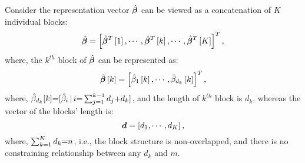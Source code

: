 Consider the representation vector $\hat{\boldsymbol{\beta}}$ can be viewed as a concatenation of $K$ individual blocks:
\begin{equation*}
\label{eq:Beta Structure-whole}
\hat{\boldsymbol{\beta}} = \left[ \hat{\boldsymbol{\beta}}^T\left[ 1 \right], \cdots, \hat{\boldsymbol{\beta}}^T\left[ k \right], \cdots, \hat{\boldsymbol{\beta}}^T\left[ K \right] \right]^T,
\end{equation*}
where, the $k^{th}$ block of $\hat{\boldsymbol{\beta}}$ can be represented as:
\begin{equation*}
\label{eq:Beta Structure-block}
\hat{\boldsymbol{\beta}}\left[ k \right] = \left[ \hat{\beta}_1\left[ k \right], \cdots, \hat{\beta}_{d_k} \left[ k \right] \right]^T,
\end{equation*}
where, $\hat{\beta}_{d_k}[k] {=} [\hat{\beta}_i \, | \, i {=} \sum_{j {=} 1}^{k {-} 1} d_j {+} d_k]$, and the length of $k^{th}$ block is $d_k$, whereas the vector of the blocks' length is:
\begin{equation*}
\label{eq:d}
\boldsymbol{d} = \left[ d_1, \cdots, d_K \right],
\end{equation*}
where, $\sum_{k=1}^K d_k {=} n$, i.e., the block structure is non-overlapped, and there is no constraining relationship between any $d_k$ and $m$.